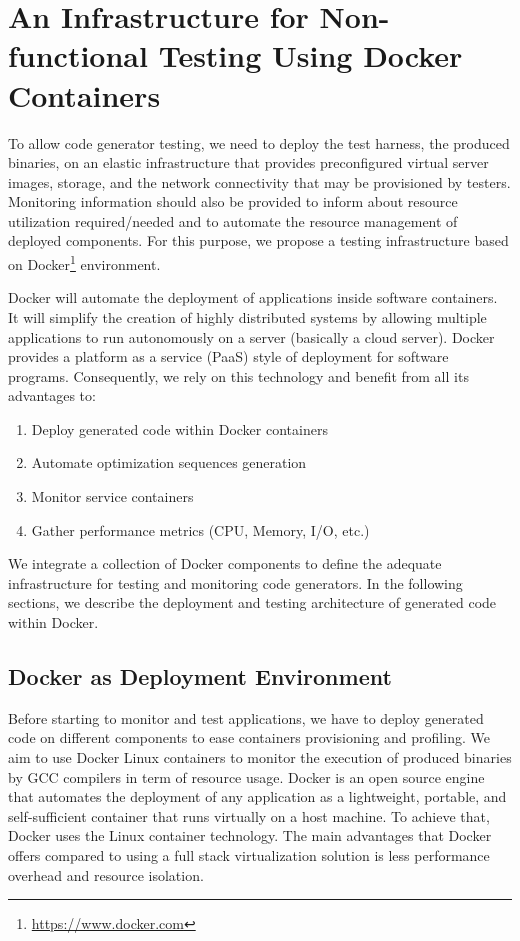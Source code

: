 \section{An Infrastructure for Non-functional Testing Using Docker Containers}

To allow code generator testing, we need to deploy the test harness, \ie the produced binaries, on an elastic infrastructure that provides preconfigured virtual server images, storage, and the network connectivity that may be provisioned by testers. 
Monitoring information should also be provided to inform about resource utilization required/needed and to automate the resource management of deployed components. 
For this purpose, we propose a testing infrastructure based on Docker\footnote{\url{https://www.docker.com}} environment. 

Docker will automate the deployment of applications inside software containers. It will simplify the creation of highly distributed systems by allowing multiple applications to run autonomously on a server (basically a cloud server). 
Docker provides a platform as a service (PaaS) style of deployment for software programs. 
Consequently, we rely on this technology and benefit from all its advantages to:
\begin{enumerate}
	\item Deploy generated code within Docker containers
	\item Automate optimization sequences generation
	\item Monitor service containers
	\item Gather performance metrics (CPU, Memory, I/O, etc.)
\end{enumerate}

We integrate a collection of Docker components to define the adequate infrastructure for testing and monitoring code generators. 
In the following sections, we describe the deployment and testing architecture of generated code within Docker.

\subsection{Docker as Deployment Environment}

Before starting to monitor and test applications, we have to deploy generated code on different components to ease containers provisioning and profiling.
We aim to use Docker Linux containers to monitor the execution of produced binaries by GCC compilers in term of resource usage. 
Docker is an open source engine that automates the deployment of any application as a lightweight, portable, and self-sufficient container that runs virtually on a host machine. 
To achieve that, Docker uses the Linux container technology. The main advantages that Docker offers compared to using a full stack virtualization solution is less performance overhead and resource isolation. 


